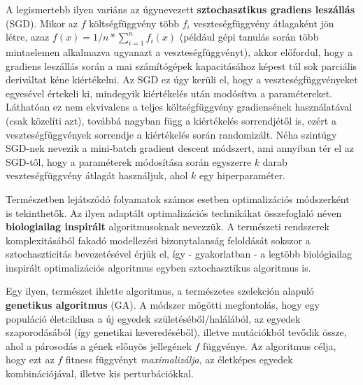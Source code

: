 A legismertebb ilyen variáns az úgynevezett \textbf{sztochasztikus gradiens leszállás} (SGD). Mikor az $f$ költségfüggvény több $f_i$ veszteségfüggvény átlagaként jön létre, azaz $f(x) = 1/n * \sum_{i=1}^{n} f_i(x)$ (például gépi tanulás során több mintaelemen alkalmazva ugyanazt a veszteségfüggvényt), akkor előfordul, hogy a gradiens leszállás során a mai számítógépek kapacitásához képest túl sok parciális deriváltat kéne kiértékelni. Az SGD ez úgy kerüli el, hogy a veszteségfüggvényeket egyesével értekeli ki, mindegyik kiértékelés után modósítva a paramétereket. Láthatóan ez nem ekvivalens a teljes költségfüggvény gradiensének használatával (csak közelíti azt), továbbá nagyban függ a kiértékelés sorrendjétől is, ezért a veszteségfüggvények sorrendje a kiértékelés során randomizált. Néha szintúgy SGD-nek nevezik a mini-batch gradient descent módszert, ami annyiban tér el az SGD-től, hogy a paraméterek módosítása során egyszerre $k$ darab veszteségfüggvény átlagát használjuk, ahol $k$ egy hiperparaméter.


Természetben lejátszódó folyamatok számos esetben optimalizációs módszerként is tekinthetők. Az ilyen adaptált optimalizációs technikákat összefoglaló néven \textbf{biologiailag inspirált} algoritmusoknak nevezzük. A természeti rendszerek komplexitásából fakadó modellezési bizonytalanság feloldását sokszor a sztochaszticitás bevezetésével érjük el, így - gyakorlatban - a legtöbb biológiailag inspirált optimalizációs algoritmus egyben sztochasztikus algoritmus is.


Egy ilyen, természet ihlette algoritmus, a természetes szelekción alapuló \textbf{genetikus algoritmus} (GA)\cite{genetic_algorithm, non_gradient_optimization}. A módszer mögötti megfontolás, hogy egy populáció életciklusa a új egyedek születéséből/halálából, az egyedek szaporodásából (így genetikai keveredéséből), illetve mutációkból tevődik össze, ahol a párosodás a gének előnyös jellegének $f$ függvénye. Az algoritmus célja, hogy ezt az $f$ fitness függvényt \textit{maximalizálja}, az életképes egyedek kombinációjával, illetve kis perturbációkkal.

